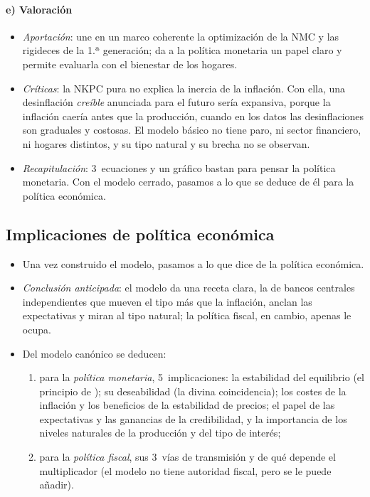 \documentclass[11pt]{article}
\begin{document}
\paragraph{e) Valoración}

\begin{itemize}
\item \emph{Aportación}: une en un marco coherente la optimización de la NMC y las rigideces de la 1.ª generación; da a la política monetaria un papel claro y permite evaluarla con el bienestar de los hogares.
\item \emph{Críticas}: la NKPC pura no explica la inercia de la inflación. Con ella, una desinflación \emph{creíble} anunciada para el futuro sería expansiva, porque la inflación caería antes que la producción, cuando en los datos las desinflaciones son graduales y costosas\nocite{Ball1994Credible}. El modelo básico no tiene paro, ni sector financiero, ni hogares distintos, y su tipo natural y su brecha no se observan.
\item \emph{Recapitulación}: 3~ecuaciones y un gráfico bastan para pensar la política monetaria. Con el modelo cerrado, pasamos a lo que se deduce de él para la política económica.
\end{itemize}


\subsection{Implicaciones de política económica}\label{sec:implicaciones}

\begin{itemize}
\item Una vez construido el modelo, pasamos a lo que dice de la política económica.
\item \emph{Conclusión anticipada}: el modelo da una receta clara, la de bancos centrales independientes que mueven el tipo más que la inflación, anclan las expectativas y miran al tipo natural; la política fiscal, en cambio, apenas le ocupa.
\item Del modelo canónico se deducen:
  \begin{enumerate}
  \item para la \emph{política monetaria}, 5~implicaciones: la estabilidad del equilibrio (el principio de ); su deseabilidad (la divina coincidencia); los costes de la inflación y los beneficios de la estabilidad de precios; el papel de las expectativas y las ganancias de la credibilidad, y la importancia de los niveles naturales de la producción y del tipo de interés;
  \item para la \emph{política fiscal}, sus 3~vías de transmisión y de qué depende el multiplicador (el modelo no tiene autoridad fiscal, pero se le puede añadir).
  \end{enumerate}
\end{itemize}
\end{document}
